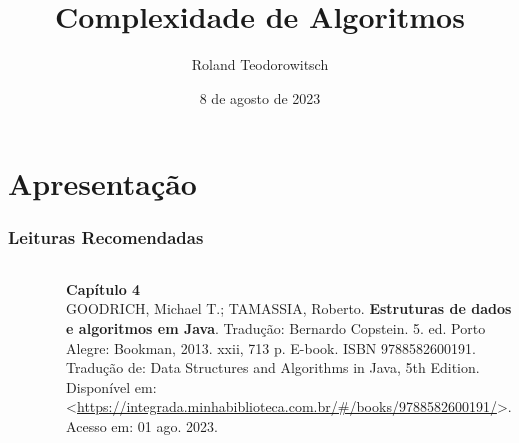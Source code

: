 \documentclass[aspectratio=169]{beamer}
\title[\sc{Complexidade de Algoritmos}]{Complexidade de Algoritmos}
\author[Roland Teodorowitsch]{Roland Teodorowitsch}
\institute[ALEST I - EP - PUCRS]{Algoritmos e Estruturas de Dados I - Escola Politécnica - PUCRS}
\date{8 de agosto de 2023}
\begin{document}
\justifying

\begin{frame}
	\titlepage
\end{frame}

\section{Apresentação}

\begin{frame}\frametitle{Leituras Recomendadas}

\begin{columns}[T]
\begin{column}{0.15\linewidth}
\vspace{-3mm}
\begin{figure}[h]
	\centering
	\includegraphics[height=0.3\paperheight]{imagens/livro_goodrich.jpg}
\end{figure}
\end{column}
\begin{column}{0.85\linewidth}
\vspace{3mm}
\textbf{Capítulo 4}\\
\scriptsize{GOODRICH, Michael T.; TAMASSIA, Roberto. \textbf{Estruturas de dados e algoritmos em Java}. Tradução: Bernardo Copstein. 5. ed. Porto Alegre: Bookman, 2013. xxii, 713 p. E-book. ISBN 9788582600191. Tradução de: Data Structures and Algorithms in Java, 5th Edition. Disponível em: \textless{}\url{https://integrada.minhabiblioteca.com.br/\#/books/9788582600191/}\textgreater{}. Acesso em: 01 ago. 2023.}
\end{column}
\end{columns}

\vspace{5mm}


\end{frame}
\end{document}
